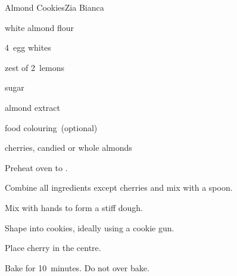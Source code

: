 \begin{recipe}{Almond Cookies}{Zia Bianca}{}

\begin{ingredients}
\item {} white almond flour
\item 4~egg whites
\item zest of 2~lemons
\item {} sugar
\item \tp{\half} almond extract
\item food colouring~(optional)
\item cherries, candied or whole almonds
\end{ingredients}

\begin{directions}
\item Preheat oven to .
\item Combine all ingredients except cherries and mix with a spoon.
\item Mix with hands to form a stiff dough.
\item Shape into cookies, ideally using a cookie gun.
\item Place cherry in the centre.
\item Bake for 10~minutes. Do not over bake.
\end{directions}

\end{recipe}
